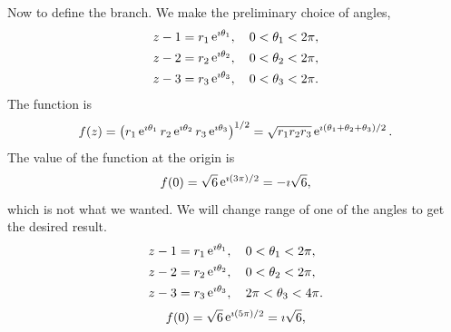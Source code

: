 {\begin{Solution}
  Now to define the branch.  We make the preliminary choice of angles,
  \begin{align*}
    z-1 &= r_1 \mathop{\mathrm{e}}\nolimits^{\imath \theta_1}, \quad 0 < \theta_1 < 2 \pi, 
    \\
    z-2 &= r_2 \mathop{\mathrm{e}}\nolimits^{\imath \theta_2}, \quad 0 < \theta_2 < 2 \pi, 
    \\
    z-3 &= r_3 \mathop{\mathrm{e}}\nolimits^{\imath \theta_3}, \quad 0 < \theta_3 < 2 \pi.
  \end{align*}
  The function is
  \[
  f(z) = \left( r_1 \mathop{\mathrm{e}}\nolimits^{\imath \theta_1} r_2 \mathop{\mathrm{e}}\nolimits^{\imath \theta_2} r_3 \mathop{\mathrm{e}}\nolimits^{\imath \theta_3} 
  \right)^{1/2}
  = \sqrt{ r_1 r_2 r_3 } \mathop{\mathrm{e}}\nolimits^{\imath \left( \theta_1 + \theta_2 + \theta_3 \right)/2 }.
  \]
  The value of the function at the origin is
  \[
  f(0) = \sqrt{ 6 } \mathop{\mathrm{e}}\nolimits^{\imath (3 \pi)/2} = - \imath \sqrt{6},
  \]
  which is not what we wanted.  We will change range of one of the angles to 
  get the desired result.
  \begin{align*}
    z-1 &= r_1 \mathop{\mathrm{e}}\nolimits^{\imath \theta_1}, \quad 0 < \theta_1 < 2 \pi, 
    \\
    z-2 &= r_2 \mathop{\mathrm{e}}\nolimits^{\imath \theta_2}, \quad 0 < \theta_2 < 2 \pi, 
    \\
    z-3 &= r_3 \mathop{\mathrm{e}}\nolimits^{\imath \theta_3}, \quad 2 \pi < \theta_3 < 4 \pi.
  \end{align*}
  \[
  f(0) = \sqrt{ 6 } \mathop{\mathrm{e}}\nolimits^{\imath (5 \pi)/2} = \imath \sqrt{6},
  \]
\end{Solution}
}














